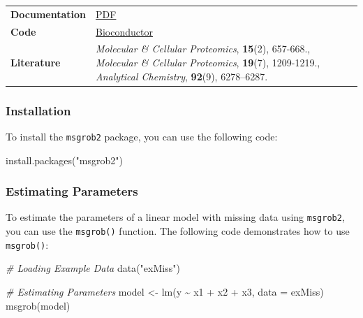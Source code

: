 \documentclass[
]{book}
\newenvironment{Shaded}{\begin{snugshade}}{\end{snugshade}}
\newcommand{\AttributeTok}[1]{\textcolor[rgb]{0.77,0.63,0.00}{#1}}
\newcommand{\CommentTok}[1]{\textcolor[rgb]{0.56,0.35,0.01}{\textit{#1}}}
\newcommand{\FunctionTok}[1]{\textcolor[rgb]{0.00,0.00,0.00}{#1}}
\newcommand{\NormalTok}[1]{#1}
\newcommand{\OtherTok}[1]{\textcolor[rgb]{0.56,0.35,0.01}{#1}}
\newcommand{\SpecialCharTok}[1]{\textcolor[rgb]{0.00,0.00,0.00}{#1}}
\newcommand{\StringTok}[1]{\textcolor[rgb]{0.31,0.60,0.02}{#1}}
\begin{document}
\begin{longtable}[]{@{}
  >{\raggedright\arraybackslash}p{}
  >{\raggedright\arraybackslash}p{}@{}}
\toprule\noalign{}
\endhead
\bottomrule\noalign{}
\endlastfoot
\textbf{Documentation} & \href{https://www.bioconductor.org/packages/release/bioc/manuals/msqrob2/man/msqrob2.pdf}{PDF} \\
\textbf{Code} & \href{https://www.bioconductor.org/packages/release/bioc/html/msqrob2.html}{Bioconductor} \\
\textbf{Literature} & \emph{Molecular \& Cellular Proteomics}, \textbf{15}(2), 657-668., \emph{Molecular \& Cellular Proteomics}, \textbf{19}(7), 1209-1219., \emph{Analytical Chemistry}, \textbf{92}(9), 6278--6287. \\
\end{longtable}

\hypertarget{installation-4}{%
\subsubsection*{Installation}\label{installation-4}}

To install the \texttt{msgrob2} package, you can use the following code:

\begin{Shaded}
\begin{Highlighting}[]
\FunctionTok{install.packages}\NormalTok{(}\StringTok{"msgrob2"}\NormalTok{)}
\end{Highlighting}
\end{Shaded}

\hypertarget{estimating-parameters}{%
\subsubsection*{Estimating Parameters}\label{estimating-parameters}}

To estimate the parameters of a linear model with missing data using \texttt{msgrob2}, you can use the \texttt{msgrob()} function. The following code demonstrates how to use \texttt{msgrob()}:

\begin{Shaded}
\begin{Highlighting}[]
\CommentTok{\# Loading Example Data}
\FunctionTok{data}\NormalTok{(}\StringTok{"exMiss"}\NormalTok{)}

\CommentTok{\# Estimating Parameters}
\NormalTok{model }\OtherTok{\textless{}{-}} \FunctionTok{lm}\NormalTok{(y }\SpecialCharTok{\textasciitilde{}}\NormalTok{ x1 }\SpecialCharTok{+}\NormalTok{ x2 }\SpecialCharTok{+}\NormalTok{ x3, }\AttributeTok{data =}\NormalTok{ exMiss)}
\FunctionTok{msgrob}\NormalTok{(model)}
\end{Highlighting}
\end{Shaded}
\end{document}
